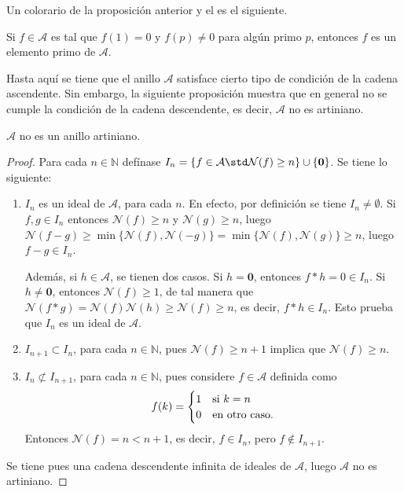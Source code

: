 Un colorario de la proposición anterior y el  es el siguiente.

\begin{corollary}
Si $f \in \mathcal{A}$ es tal que $f(1) = 0$ y $f(p) \ne 0$ para algún primo $p$, entonces $f$ es un elemento primo de $\mathcal{A}$.
\end{corollary}

Hasta aquí se tiene que el anillo $\mathcal{A}$ satisface cierto tipo de condición de la cadena ascendente. Sin embargo, la siguiente proposición muestra que en general no se cumple la condición de la cadena descendente, es decir, $\mathcal{A}$ no es artiniano.

\begin{proposition}
$\mathcal{A}$ no es un anillo artiniano.
\end{proposition}
\begin{proof}
Para cada $n \in \mathbb{N}$ defínase $I_n = \{ f \in \mathcal{A} \std \mathcal{N}(f) \ge n \} \cup \{ \mathbf{0} \}$. Se tiene lo siguiente:\begin{enumerate}[label=\textnormal{(\arabic*)}]
\item $I_n$ es un ideal de $\mathcal{A}$, para cada $n$. En efecto, por definición se tiene $I_n \ne \emptyset$. Si $f,g \in I_n$ entonces $\mathcal{N}(f) \ge n$ y $\mathcal{N}(g) \ge n$, luego $\mathcal{N}(f-g) \ge \min \{ \mathcal{N}(f), \mathcal{N}(-g) \} = \min \{ \mathcal{N}(f),\mathcal{N}(g) \} \ge n$, luego $f-g \in I_n$.
\bigskip

Además, si $h \in \mathcal{A}$, se tienen dos casos. Si $h=\mathbf{0}$, entonces $f*h=0 \in I_n$. Si $h \ne \mathbf{0}$, entonces $\mathcal{N}(f) \ge 1$, de tal manera que $\mathcal{N}(f*g)=\mathcal{N}(f)\mathcal{N}(h) \ge \mathcal{N}(f) \ge n$, es decir, $f*h \in I_n$. Esto prueba que $I_n$ es un ideal de $\mathcal{A}$.
\item $I_{n+1} \subset I_n$, para cada $n \in \mathbb{N}$, pues $\mathcal{N}(f) \ge n+1$ implica que $\mathcal{N}(f) \ge n$.
\item $I_n \not \subset I_{n+1}$, para cada $n \in \mathbb{N}$, pues considere $f \in \mathcal{A}$ definida como
\begin{equation*}
    f(k) = \begin{cases}
        \hfil 1 & \text{si } k=n \\
        \hfil 0 & \text{en otro caso.}
    \end{cases}
\end{equation*}
Entonces $\mathcal{N}(f) = n < n+1$, es decir, $f \in I_n$, pero $f \notin I_{n+1}$.
\end{enumerate}
Se tiene pues una cadena descendente infinita de ideales de $\mathcal{A}$, luego $\mathcal{A}$ no es artiniano.
\end{proof}

